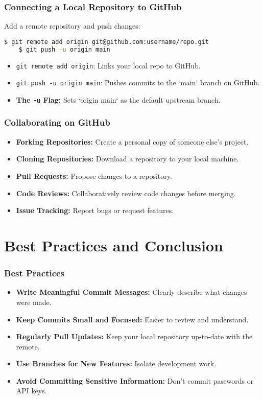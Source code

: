 
\begin{frame}[fragile]
	\frametitle{Connecting a Local Repository to GitHub}
	Add a remote repository and push changes:
	\begin{lstlisting}[language=bash]
	$ git remote add origin git@github.com:username/repo.git
	$ git push -u origin main
	\end{lstlisting}
	\begin{itemize}
		\item \texttt{git remote add origin}: Links your local repo to GitHub.
		\item \texttt{git push -u origin main}: Pushes commits to the `main` branch on GitHub.
		\item \textbf{The \texttt{-u} Flag:} Sets `origin main` as the default upstream branch.
	\end{itemize}
\end{frame}

\begin{frame}
	\frametitle{Collaborating on GitHub}
	\begin{itemize}
		\item \textbf{Forking Repositories:} Create a personal copy of someone else's project.
		\item \textbf{Cloning Repositories:} Download a repository to your local machine.
		\item \textbf{Pull Requests:} Propose changes to a repository.
		\item \textbf{Code Reviews:} Collaboratively review code changes before merging.
		\item \textbf{Issue Tracking:} Report bugs or request features.
	\end{itemize}
\end{frame}

\section{Best Practices and Conclusion}

\begin{frame}
	\frametitle{Best Practices}
	\begin{itemize}
		\item \textbf{Write Meaningful Commit Messages:} Clearly describe what changes were made.
		\item \textbf{Keep Commits Small and Focused:} Easier to review and understand.
		\item \textbf{Regularly Pull Updates:} Keep your local repository up-to-date with the remote.
		\item \textbf{Use Branches for New Features:} Isolate development work.
		\item \textbf{Avoid Committing Sensitive Information:} Don't commit passwords or API keys.
	\end{itemize}
\end{frame}


